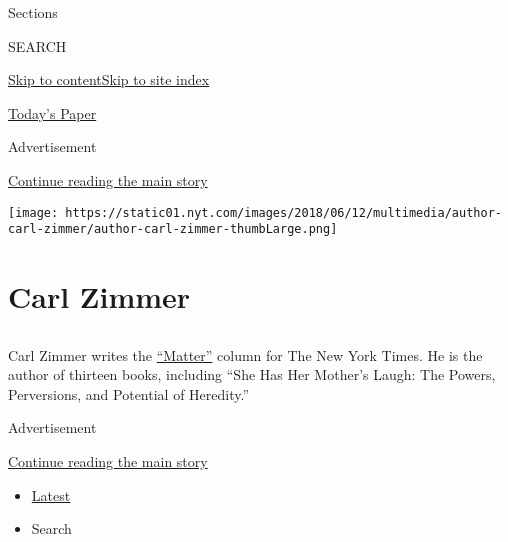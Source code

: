 Sections

SEARCH

\protect\hyperlink{site-content}{Skip to
content}\protect\hyperlink{site-index}{Skip to site index}

\href{https://myaccount.nytimes.com/auth/login?response_type=cookie\&client_id=vi}{}

\href{https://www.nytimes.com/section/todayspaper}{Today's Paper}

Advertisement

\protect\hyperlink{after-top}{Continue reading the main story}

\texttt{[image: https://static01.nyt.com/images/2018/06/12/multimedia/author-carl-zimmer/author-carl-zimmer-thumbLarge.png]}

\hypertarget{carl-zimmer}{%
\section{Carl Zimmer}\label{carl-zimmer}}

\subsection{}

Carl Zimmer writes the
\href{https://www.nytimes.com/column/matter}{``Matter''} column for The
New York Times. He is the author of thirteen books, including ``She Has
Her Mother's Laugh: The Powers, Perversions, and Potential of
Heredity.''

Advertisement

\protect\hyperlink{after-mid1}{Continue reading the main story}

\begin{itemize}
\tightlist
\item
  \protect\hyperlink{stream-panel}{Latest}
\item
  Search
\end{itemize}

